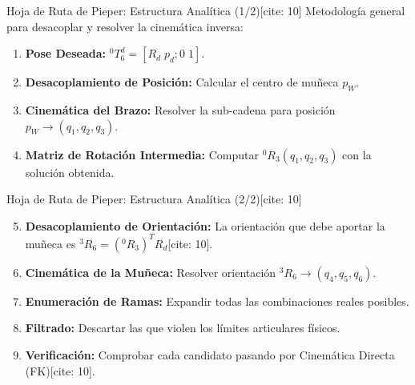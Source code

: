 \documentclass[aspectratio=169, xcolor={table,xcdraw}]{beamer}
\begin{document}
\begin{frame}{Hoja de Ruta de Pieper: Estructura Analítica (1/2)[cite: 10]}
    Metodología general para desacoplar y resolver la cinemática inversa:
    \begin{enumerate}
        \item \textbf{Pose Deseada:} ${}^0T_6^d = [R_d \; p_d; 0 \; 1]$.
        \item \textbf{Desacoplamiento de Posición:} Calcular el centro de muñeca $p_W$.
        \item \textbf{Cinemática del Brazo:} Resolver la sub-cadena para posición $p_W \rightarrow (q_1, q_2, q_3)$.
        \item \textbf{Matriz de Rotación Intermedia:} Computar ${}^0R_3(q_1, q_2, q_3)$ con la solución obtenida.
    \end{enumerate}
\end{frame}

\begin{frame}{Hoja de Ruta de Pieper: Estructura Analítica (2/2)[cite: 10]}
    \begin{enumerate}
        \setcounter{enumi}{4}
        \item \textbf{Desacoplamiento de Orientación:} La orientación que debe aportar la muñeca es $\boxed{{}^3R_6 = ({}^0R_3)^T R_d}$[cite: 10].
        \item \textbf{Cinemática de la Muñeca:} Resolver orientación ${}^3R_6 \rightarrow (q_4, q_5, q_6)$.
        \item \textbf{Enumeración de Ramas:} Expandir todas las combinaciones reales posibles.
        \item \textbf{Filtrado:} Descartar las que violen los límites articulares físicos.
        \item \textbf{Verificación:} Comprobar cada candidato pasando por Cinemática Directa (FK)[cite: 10].
    \end{enumerate}
\end{frame}
\end{document}
